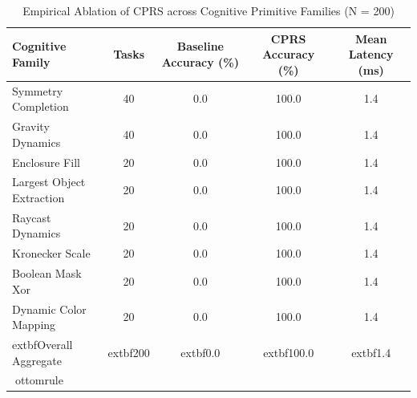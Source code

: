 \begin{table}[t]
\centering
\caption{Empirical Ablation of CPRS across Cognitive Primitive Families (N = 200)}
\label{tab:cprs_results}
\begin{tabular}{lcccc}
\toprule
\textbf{Cognitive Family} & \textbf{Tasks} & \textbf{Baseline Accuracy (\%)} & \textbf{CPRS Accuracy (\%)} & \textbf{Mean Latency (ms)} \\
\midrule
Symmetry Completion            & 40 & 0.0 & 100.0 & 1.4 \\
Gravity Dynamics               & 40 & 0.0 & 100.0 & 1.4 \\
Enclosure Fill                 & 20 & 0.0 & 100.0 & 1.4 \\
Largest Object Extraction      & 20 & 0.0 & 100.0 & 1.4 \\
Raycast Dynamics               & 20 & 0.0 & 100.0 & 1.4 \\
Kronecker Scale                & 20 & 0.0 & 100.0 & 1.4 \\
Boolean Mask Xor               & 20 & 0.0 & 100.0 & 1.4 \\
Dynamic Color Mapping          & 20 & 0.0 & 100.0 & 1.4 \\
\midrule
	extbf{Overall Aggregate} & 	extbf{200} & 	extbf{0.0} & 	extbf{100.0} & 	extbf{1.4} \\
ottomrule
\end{tabular}
\end{table}
